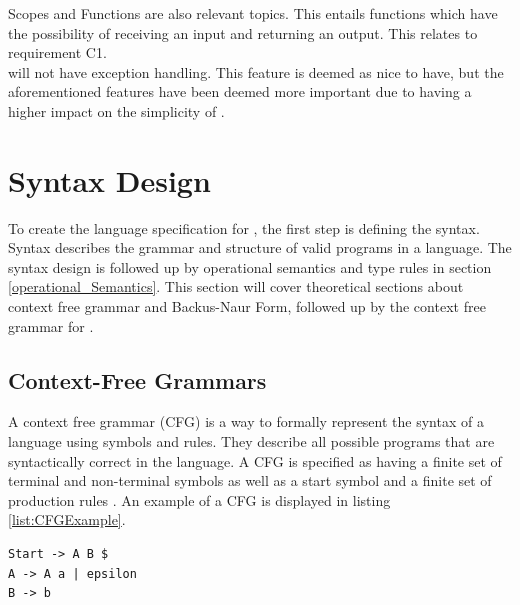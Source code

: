 Scopes and Functions are also relevant topics. This entails functions which have the possibility of receiving an input and returning an output. This relates to requirement C1. 
\\

\lang will not have exception handling. This feature is deemed as nice to have, but the aforementioned features have been deemed more important due to having a higher impact on the simplicity of \lang.   


\section{Syntax Design} \label{sec:SyntaxDesign}
To create the language specification for \lang, the first step is defining the syntax. Syntax describes the grammar and structure of valid programs in a language. The syntax design is followed up by operational semantics and type rules in section \ref{operational_Semantics}.
This section will cover theoretical sections about context free grammar and Backus-Naur Form, followed up by the context free grammar for \lang.



\subsection{Context-Free Grammars} \label{LD: CFG}
A context free grammar (CFG) is a way to formally represent the syntax of a language using symbols and rules. They describe all possible programs that are syntactically correct in the language. A CFG is specified as having a finite set of terminal and non-terminal symbols as well as a start symbol and a finite set of production rules \cite{SPO_Topic_5}. An example of a CFG is displayed in listing \ref{list:CFGExample}.

\begin{lstlisting}[language=scriptkid, label={list:CFGExample},caption=An example of a CFG. The language accepts strings of zero or more A's followed by a 'b' ]
Start -> A B $
A -> A a | epsilon
B -> b
\end{lstlisting}

